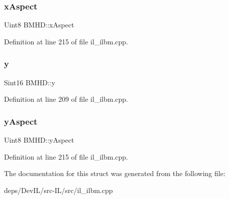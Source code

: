 \subsubsection{\texorpdfstring{x\+Aspect}{xAspect}}
{\footnotesize\ttfamily Uint8 B\+M\+H\+D\+::x\+Aspect}



Definition at line 215 of file il\+\_\+ilbm.\+cpp.

\mbox{\label{structBMHD_a27876b98ed5e9b3ea5bbcc5da72fff8d}} 
\subsubsection{\texorpdfstring{y}{y}}
{\footnotesize\ttfamily Sint16 B\+M\+H\+D\+::y}



Definition at line 209 of file il\+\_\+ilbm.\+cpp.

\mbox{\label{structBMHD_a518b0899286d4bde5d5bd4f7999f7a2e}} 
\subsubsection{\texorpdfstring{y\+Aspect}{yAspect}}
{\footnotesize\ttfamily Uint8 B\+M\+H\+D\+::y\+Aspect}



Definition at line 215 of file il\+\_\+ilbm.\+cpp.



The documentation for this struct was generated from the following file\+:\begin{DoxyCompactItemize}
\item 
deps/\+Dev\+I\+L/src-\/\+I\+L/src/il\+\_\+ilbm.\+cpp\end{DoxyCompactItemize}
